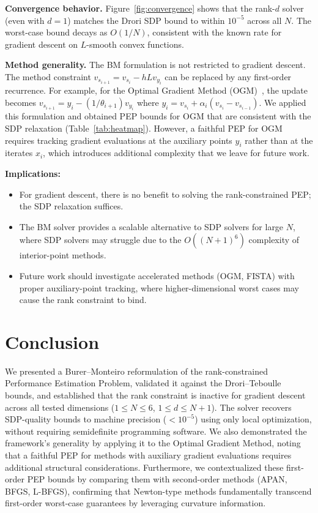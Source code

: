 \documentclass[11pt]{article}
\begin{document}
\textbf{Convergence behavior.} Figure~\ref{fig:convergence} shows that the rank-$d$ solver (even with $d=1$) matches the Drori SDP bound to within $10^{-5}$ across all $N$.
The worst-case bound decays as $O(1/N)$, consistent with the known rate for gradient descent on $L$-smooth convex functions.

\textbf{Method generality.} The BM formulation is not restricted to gradient descent.
The method constraint $v_{s_{i+1}} = v_{s_i} - h L v_{y_i}$ can be replaced by any first-order recurrence.
For example, for the Optimal Gradient Method (OGM)~\cite{kim2016optimal}, the update becomes
$v_{s_{i+1}} = y_i - (1/\theta_{i+1}) v_{y_i}$ where $y_i = v_{s_i} + \alpha_i (v_{s_i} - v_{s_{i-1}})$.
We applied this formulation and obtained PEP bounds for OGM that are consistent with the SDP relaxation (Table~\ref{tab:heatmap}).
However, a faithful PEP for OGM requires tracking gradient evaluations at the auxiliary points $y_i$ rather than at the iterates $x_i$, which introduces additional complexity that we leave for future work.

\textbf{Implications:}
\begin{itemize}
\item For gradient descent, there is no benefit to solving the rank-constrained PEP; the SDP relaxation suffices.
\item The BM solver provides a scalable alternative to SDP solvers for large $N$, where SDP solvers may struggle due to the $O((N+1)^6)$ complexity of interior-point methods.
\item Future work should investigate accelerated methods (OGM, FISTA) with proper auxiliary-point tracking, where higher-dimensional worst cases may cause the rank constraint to bind.
\end{itemize}

\section{Conclusion}

We presented a Burer--Monteiro reformulation of the rank-constrained Performance Estimation Problem, validated it against the Drori--Teboulle bounds, and established that the rank constraint is inactive for gradient descent across all tested dimensions ($1 \leq N \leq 6$, $1 \leq d \leq N+1$).
The solver recovers SDP-quality bounds to machine precision ($< 10^{-5}$) using only local optimization, without requiring semidefinite programming software.
We also demonstrated the framework's generality by applying it to the Optimal Gradient Method, noting that a faithful PEP for methods with auxiliary gradient evaluations requires additional structural considerations.
Furthermore, we contextualized these first-order PEP bounds by comparing them with second-order methods (APAN, BFGS, L-BFGS), confirming that Newton-type methods fundamentally transcend first-order worst-case guarantees by leveraging curvature information.
\end{document}
